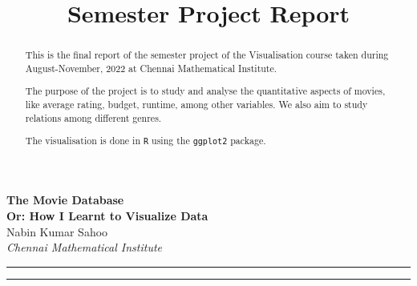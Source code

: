 \documentclass[10pt]{article}
\author{}
\title{Semester Project Report}
\begin{document}
\begin{center}
    {\Large \textbf{The Movie Database \\ Or: How I Learnt to Visualize Data}}\\
    \vspace{1em}
    {\large Nabin Kumar Sahoo}\\
    \vspace{1em}
    \textit{Chennai Mathematical Institute}
\end{center}
\begin{center}
    \rule{165mm}{0.2mm}
\end{center}

\begin{abstract}
This is the final report of the semester project of the Visualisation course taken during August-November, 2022 at Chennai Mathematical Institute. 

The purpose of the project is to study and analyse 
the quantitative aspects of movies, like average rating, budget, runtime, among other variables.
We also aim to study relations among different genres.

The visualisation is done in \texttt{R} using the \texttt{ggplot2} package. 
\end{abstract}

\begin{center}
    \rule{165mm}{0.2mm}
\end{center}
\end{document}
